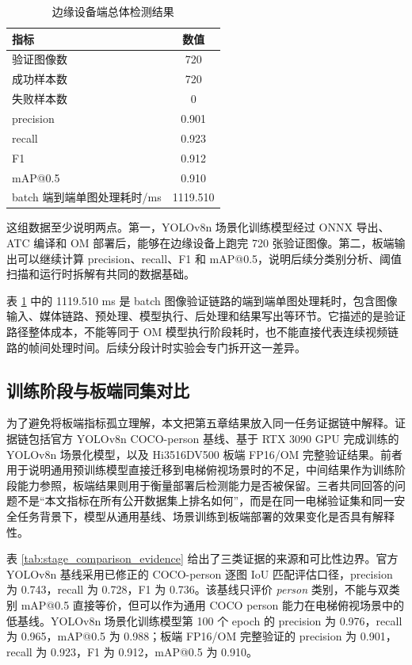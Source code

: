 \begin{table}[htbp]
    \centering
    \caption{边缘设备端总体检测结果}
    \label{tab:board_overall_results}
    \begin{tabular}{l c}
        \toprule
        指标 & 数值 \\
        \midrule
        验证图像数 & 720 \\
        成功样本数 & 720 \\
        失败样本数 & 0 \\
        precision & 0.901 \\
        recall & 0.923 \\
        F1 & 0.912 \\
        mAP@0.5 & 0.910 \\
        batch 端到端单图处理耗时/ms & 1119.510 \\
        \bottomrule
    \end{tabular}
\end{table}

这组数据至少说明两点。第一，YOLOv8n 场景化训练模型经过 ONNX 导出、ATC 编译和 OM 部署后，能够在边缘设备上跑完 720 张验证图像。第二，板端输出可以继续计算 precision、recall、F1 和 mAP@0.5，说明后续分类别分析、阈值扫描和运行时拆解有共同的数据基础。

表 \ref{tab:board_overall_results} 中的 1119.510 ms 是 batch 图像验证链路的端到端单图处理耗时，包含图像输入、媒体链路、预处理、模型执行、后处理和结果写出等环节。它描述的是验证路径整体成本，不能等同于 OM 模型执行阶段耗时，也不能直接代表连续视频链路的帧间处理时间。后续分段计时实验会专门拆开这一差异。

\subsection{训练阶段与板端同集对比}

为了避免将板端指标孤立理解，本文把第五章结果放入同一任务证据链中解释。证据链包括官方 YOLOv8n COCO-person 基线、基于 RTX 3090 GPU 完成训练的 YOLOv8n 场景化模型，以及 Hi3516DV500 板端 FP16/OM 完整验证结果。前者用于说明通用预训练模型直接迁移到电梯俯视场景时的不足，中间结果作为训练阶段能力参照，板端结果则用于衡量部署后检测能力是否被保留。三者共同回答的问题不是“本文指标在所有公开数据集上排名如何”，而是在同一电梯验证集和同一安全任务背景下，模型从通用基线、场景训练到板端部署的效果变化是否具有解释性。

表 \ref{tab:stage_comparison_evidence} 给出了三类证据的来源和可比性边界。官方 YOLOv8n 基线采用已修正的 COCO-person 逐图 IoU 匹配评估口径，precision 为 0.743，recall 为 0.728，F1 为 0.736。该基线只评价 \textit{person} 类别，不能与双类别 mAP@0.5 直接等价，但可以作为通用 COCO person 能力在电梯俯视场景中的低基线。YOLOv8n 场景化训练模型第 100 个 epoch 的 precision 为 0.976，recall 为 0.965，mAP@0.5 为 0.988；板端 FP16/OM 完整验证的 precision 为 0.901，recall 为 0.923，F1 为 0.912，mAP@0.5 为 0.910。

